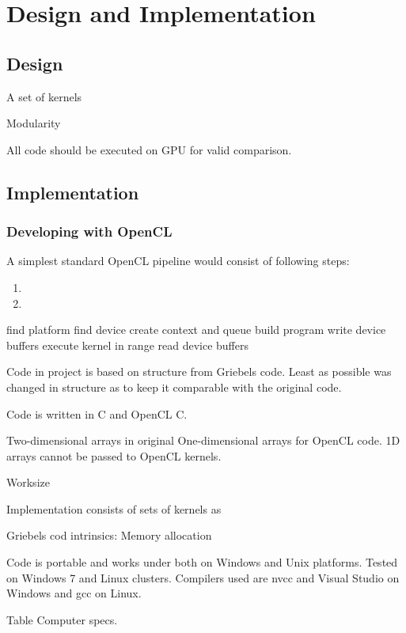 \chapter{Design and Implementation}

\section{Design}

A set of kernels

Modularity

All code should be executed on GPU for valid comparison. 

\section{Implementation}

\subsection{Developing with OpenCL}
A simplest standard OpenCL pipeline would consist of following steps:

\begin{enumerate}
\item 
\item
\end{enumerate}
find platform
find device
create context and queue
build program
write device buffers
execute kernel in range
read device buffers



Code in project is based on structure from Griebels code\cite{griebel1998numerical}. Least as possible was changed in structure as to keep it comparable with the original code.

Code is written in C and OpenCL C.

Two-dimensional arrays in original 
One-dimensional arrays for OpenCL code. 1D arrays cannot be passed to OpenCL kernels.

Worksize

Implementation consists of sets of kernels as 

Griebels cod intrinsics: Memory allocation

Code is portable and works under both on Windows and Unix platforms. Tested on Windows 7 and Linux clusters. Compilers used are nvcc and Visual Studio on Windows and gcc on Linux.

Table Computer specs.


